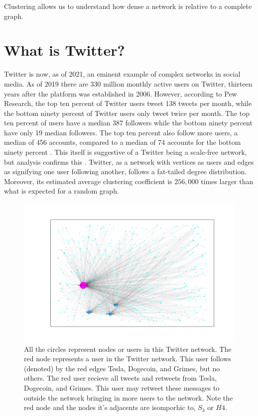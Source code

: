 \noindent Clustering allows us to understand how dense a network is relative to a complete graph. 

\section{What is Twitter?}
\label{section:Twitter}
Twitter is now, as of 2021, an eminent example of complex networks in social media.
As of 2019 there are 330 million monthly active users on Twitter, thirteen years after the platform was
established in 2006. However, according to Pew Research, the top ten percent of Twitter users tweet 138 
tweets per month, while the bottom ninety percent of Twitter users only tweet twice per month. The top ten percent of users
have a median 387 followers while the bottom ninety percent have only 19 median followers. The top ten percent
also follow more users, a median of 456 accounts, compared to a median of 74 accounts for the bottom ninety percent \cite{wojcik2019sizing}.
This itself is suggestive of a Twitter being a scale-free network, but analysis confirms this \cite{Aparicio}. Twitter, as a network
with vertices as users and edges as signifying one user following another, follows a fat-tailed degree distribution. Moreover, its estimated
average clustering coefficient is $256,000$ times larger than what is expected for a random graph.


\begin{figure}
    \includegraphics[width=16cm]{Images/elon_graph.png}
    \centering
    \caption{All the circles represent nodes or users in this Twitter network. The red node represents a user in the Twitter network. This user follows (denoted)
    by the red edges Tesla, Dogecoin, and Grimes, but no others. The 
    red user recieve all tweets and retweets from Tesla, Dogecoin, and Grimes. This user may retweet these messages
    to outside the network bringing in more users to the network. Note the red node and the nodes it's adjacents are 
    isomporhic to, $S_3$ or $H4$.}
\end{figure}


